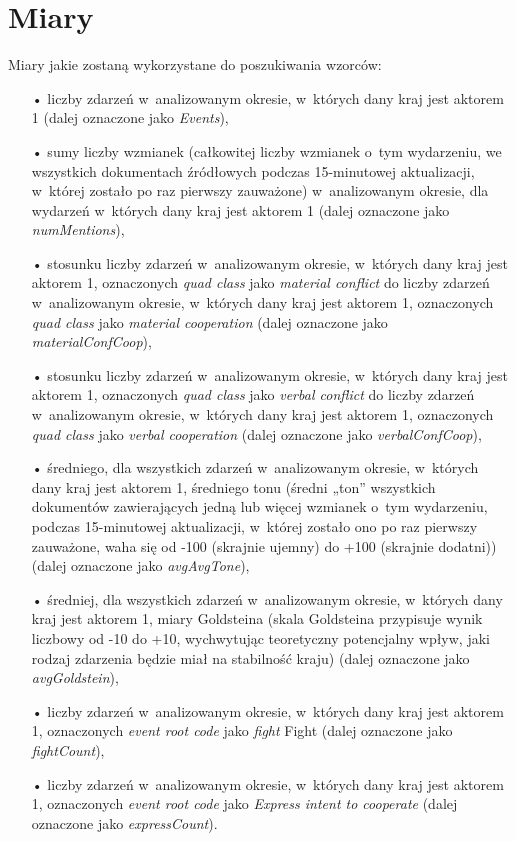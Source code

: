\documentclass[11pt]{report}
\begin{document}
    \section{Miary}\label{sec:miary}
    Miary jakie zostaną wykorzystane do poszukiwania wzorców:
    \begin{enumerate}
        \item[•] liczby zdarzeń w~analizowanym okresie, w~których dany kraj jest aktorem 1 (dalej oznaczone jako \textit{Events}),
        \item[•] sumy liczby wzmianek (całkowitej liczby wzmianek o~tym wydarzeniu, we wszystkich dokumentach źródłowych podczas 15-minutowej aktualizacji, w~której zostało po raz pierwszy zauważone) w~analizowanym okresie, dla wydarzeń w~których dany kraj jest aktorem 1 (dalej oznaczone jako \textit{numMentions}),
        \item[•] stosunku liczby zdarzeń w~analizowanym okresie, w~których dany kraj jest aktorem 1, oznaczonych \textit{quad class} jako \textit{material conflict} do liczby zdarzeń w~analizowanym okresie, w~których dany kraj jest aktorem 1, oznaczonych \textit{quad class} jako \textit{material cooperation} (dalej oznaczone jako \textit{materialConfCoop}),
        \item[•] stosunku liczby zdarzeń w~analizowanym okresie, w~których dany kraj jest aktorem 1, oznaczonych \textit{quad class} jako \textit{verbal conflict} do liczby zdarzeń w~analizowanym okresie, w~których dany kraj jest aktorem 1, oznaczonych \textit{quad class} jako \textit{verbal cooperation} (dalej oznaczone jako \textit{verbalConfCoop}),
        \item[•] średniego, dla wszystkich zdarzeń w~analizowanym okresie, w~których dany kraj jest aktorem 1, średniego tonu (średni „ton” wszystkich dokumentów zawierających jedną lub więcej wzmianek o~tym wydarzeniu, podczas 15-minutowej aktualizacji, w~której zostało ono po raz pierwszy zauważone, waha się od -100 (skrajnie ujemny) do +100 (skrajnie dodatni)) (dalej oznaczone jako \textit{avgAvgTone}),
        \item[•] średniej, dla wszystkich zdarzeń w~analizowanym okresie, w~których dany kraj jest aktorem 1, miary Goldsteina (skala Goldsteina przypisuje wynik liczbowy od -10 do +10, wychwytując teoretyczny potencjalny wpływ, jaki rodzaj zdarzenia będzie miał na stabilność kraju) (dalej oznaczone jako \textit{avgGoldstein}),
        \item[•] liczby zdarzeń w~analizowanym okresie, w~których dany kraj jest aktorem 1, oznaczonych \textit{event root code} jako \textit{fight} Fight (dalej oznaczone jako \textit{fightCount}),
        \item[•] liczby zdarzeń w~analizowanym okresie, w~których dany kraj jest aktorem 1, oznaczonych \textit{event root code} jako \textit{Express intent to cooperate}  (dalej oznaczone jako \textit{expressCount}).
    \end{enumerate}
\end{document}
